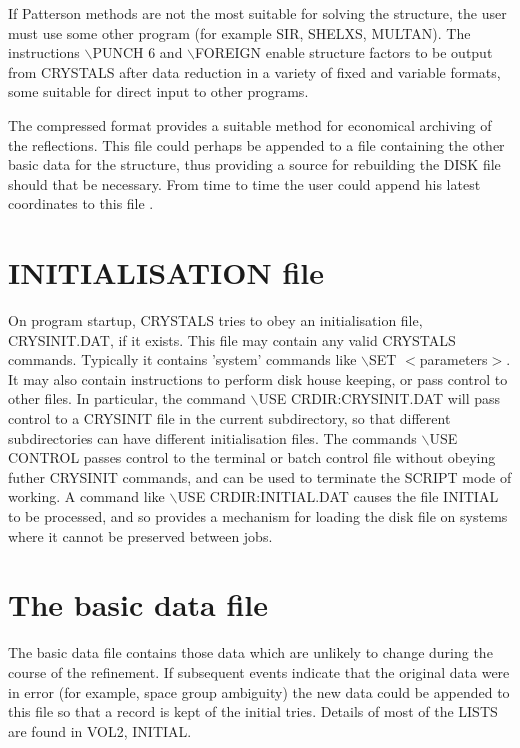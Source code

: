 \documentclass[10pt,a4paper]{report}
\begin{document}
If Patterson methods are not the most suitable for solving the structure, the user must use some other program (for example SIR, SHELXS, MULTAN).  The instructions $\backslash$PUNCH 6 and $\backslash$FOREIGN enable structure factors to  be output from CRYSTALS after data reduction in a variety of fixed and variable formats, some suitable for direct input to other programs.

 The compressed format provides a suitable method for economical archiving   of the reflections. This file could perhaps be appended to a file containing the other basic data for the structure, thus providing a source for rebuilding the DISK file should that be necessary. From time to time the user could  append his latest coordinates to this file . 

\section{INITIALISATION file}


On program startup, CRYSTALS tries to obey an initialisation file,
  CRYSINIT.DAT, if it exists. This file may contain any valid CRYSTALS
 commands. Typically it contains 'system' commands like $\backslash$SET $<$parameters$>$.
 It may also contain instructions to perform disk house keeping, or pass
 control to other files. In particular, the command $\backslash$USE 
 CRDIR:CRYSINIT.DAT will pass control to a CRYSINIT file in the current 
 subdirectory, so that different subdirectories can have different
 initialisation files. The commands $\backslash$USE CONTROL passes control to the 
 terminal or batch control file without obeying futher CRYSINIT commands,
 and can be used to terminate the SCRIPT mode of working. A command like
 $\backslash$USE CRDIR:INITIAL.DAT causes the file INITIAL to be processed, and so
 provides a mechanism for loading the disk file on systems where it cannot
 be preserved between jobs.



\section{The basic data file}


 


The basic data file contains those data which are unlikely to change 
 during the course of the refinement. If subsequent events indicate that
 the original data were in error (for example, space group ambiguity) the
 new data could be appended to this file so that a record is kept of the
 initial tries. Details of most of the LISTS are found in VOL2,  INITIAL.
\end{document}
